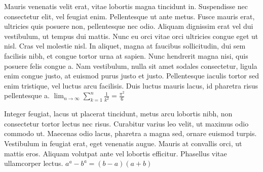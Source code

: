 \documentclass{article}
\begin{document}
Mauris venenatis velit erat, vitae lobortis magna tincidunt in. Suspendisse nec consectetur elit, vel feugiat enim. Pellentesque ut ante metus. Fusce mauris erat, ultricies quis posuere non, pellentesque nec odio. Aliquam dignissim erat vel dui vestibulum, ut tempus dui mattis. Nunc eu orci vitae orci ultricies congue eget ut nisl. Cras vel molestie nisl. In aliquet, magna at faucibus sollicitudin, dui sem facilisis nibh, et congue tortor urna at sapien.
Nunc hendrerit magna nisi, quis posuere felis congue a. Nam vestibulum, nulla sit amet sodales consectetur, ligula enim congue justo, at euismod purus justo et justo. Pellentesque iaculis tortor sed enim tristique, vel luctus arcu facilisis. Duis luctus mauris lacus, id pharetra risus pellentesque a.
$\lim_{n \to \infty}
\sum_{k=1}^n \frac{1}{k^2}
= \frac{\pi^2}{6}$

 Integer feugiat, lacus ut placerat tincidunt, metus arcu lobortis nibh, non consectetur tortor lectus nec risus. Curabitur varius leo velit, ut maximus odio commodo ut. Maecenas odio lacus, pharetra a magna sed, ornare euismod turpis. Vestibulum in feugiat erat, eget venenatis augue. Mauris at convallis orci, ut mattis eros. Aliquam volutpat ante vel lobortis efficitur. Phasellus vitae ullamcorper lectus.
\begin{math}
    a^{a}-b^{a} = (b - a)(a + b)
\end{math}
\end{document}

